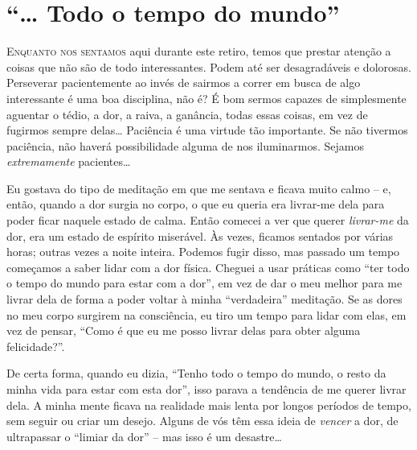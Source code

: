 \chapter{``\ldots{} Todo o tempo do mundo''}

\lettrine{E}{nquanto nos sentamos} aqui durante este retiro, temos que prestar atenção a
coisas que não são de todo interessantes. Podem até ser desagradáveis e
dolorosas. Perseverar pacientemente ao invés de sairmos a correr em busca de
algo interessante é uma boa disciplina, não é? É bom sermos capazes de
simplesmente aguentar o tédio, a dor, a raiva, a ganância, todas essas coisas,
em vez de fugirmos sempre delas\ldots{} Paciência é uma virtude tão importante.
Se não tivermos paciência, não haverá possibilidade alguma de nos iluminarmos.
Sejamos \emph{extremamente} pacientes\ldots{}

Eu gostava do tipo de meditação em que me sentava e ficava muito calmo -- e,
então, quando a dor surgia no corpo, o que eu queria era livrar-me dela para
poder ficar naquele estado de calma. Então comecei a ver que querer
\emph{livrar-me} da dor, era um estado de espírito miserável. Às vezes, ficamos
sentados por várias horas; outras vezes a noite inteira. Podemos fugir disso,
mas passado um tempo começamos a saber lidar com a dor física. Cheguei a usar
práticas como ``ter todo o tempo do mundo para estar com a dor'', em vez de dar
o meu melhor para me livrar dela de forma a poder voltar à minha ``verdadeira''
meditação. Se as dores no meu corpo surgirem na consciência, eu tiro um tempo
para lidar com elas, em vez de pensar, ``Como é que eu me posso livrar delas
para obter alguma felicidade?''.

De certa forma, quando eu dizia, ``Tenho todo o tempo do mundo, o resto da minha
vida para estar com esta dor'', isso parava a tendência de me querer livrar
dela. A minha mente ficava na realidade mais lenta por longos períodos de tempo,
sem seguir ou criar um desejo. Alguns de vós têm essa ideia de \emph{vencer} a
dor, de ultrapassar o ``limiar da dor'' -- mas isso é um desastre\ldots{}
